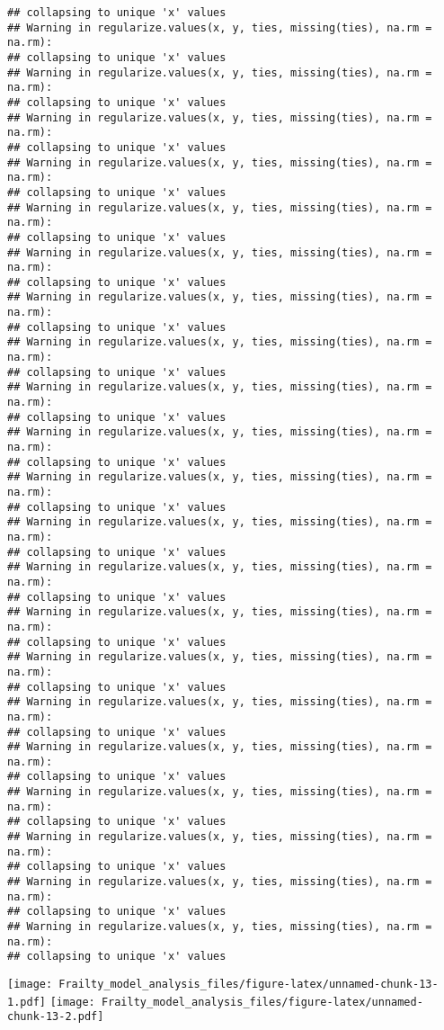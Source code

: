\documentclass[
]{article}
\begin{document}
\begin{verbatim}
## collapsing to unique 'x' values
## Warning in regularize.values(x, y, ties, missing(ties), na.rm = na.rm):
## collapsing to unique 'x' values
## Warning in regularize.values(x, y, ties, missing(ties), na.rm = na.rm):
## collapsing to unique 'x' values
## Warning in regularize.values(x, y, ties, missing(ties), na.rm = na.rm):
## collapsing to unique 'x' values
## Warning in regularize.values(x, y, ties, missing(ties), na.rm = na.rm):
## collapsing to unique 'x' values
## Warning in regularize.values(x, y, ties, missing(ties), na.rm = na.rm):
## collapsing to unique 'x' values
## Warning in regularize.values(x, y, ties, missing(ties), na.rm = na.rm):
## collapsing to unique 'x' values
## Warning in regularize.values(x, y, ties, missing(ties), na.rm = na.rm):
## collapsing to unique 'x' values
## Warning in regularize.values(x, y, ties, missing(ties), na.rm = na.rm):
## collapsing to unique 'x' values
## Warning in regularize.values(x, y, ties, missing(ties), na.rm = na.rm):
## collapsing to unique 'x' values
## Warning in regularize.values(x, y, ties, missing(ties), na.rm = na.rm):
## collapsing to unique 'x' values
## Warning in regularize.values(x, y, ties, missing(ties), na.rm = na.rm):
## collapsing to unique 'x' values
## Warning in regularize.values(x, y, ties, missing(ties), na.rm = na.rm):
## collapsing to unique 'x' values
## Warning in regularize.values(x, y, ties, missing(ties), na.rm = na.rm):
## collapsing to unique 'x' values
## Warning in regularize.values(x, y, ties, missing(ties), na.rm = na.rm):
## collapsing to unique 'x' values
## Warning in regularize.values(x, y, ties, missing(ties), na.rm = na.rm):
## collapsing to unique 'x' values
## Warning in regularize.values(x, y, ties, missing(ties), na.rm = na.rm):
## collapsing to unique 'x' values
## Warning in regularize.values(x, y, ties, missing(ties), na.rm = na.rm):
## collapsing to unique 'x' values
## Warning in regularize.values(x, y, ties, missing(ties), na.rm = na.rm):
## collapsing to unique 'x' values
## Warning in regularize.values(x, y, ties, missing(ties), na.rm = na.rm):
## collapsing to unique 'x' values
## Warning in regularize.values(x, y, ties, missing(ties), na.rm = na.rm):
## collapsing to unique 'x' values
## Warning in regularize.values(x, y, ties, missing(ties), na.rm = na.rm):
## collapsing to unique 'x' values
\end{verbatim}

\texttt{[image: Frailty\_model\_analysis\_files/figure-latex/unnamed-chunk-13-1.pdf]}
\texttt{[image: Frailty\_model\_analysis\_files/figure-latex/unnamed-chunk-13-2.pdf]}
\end{document}
